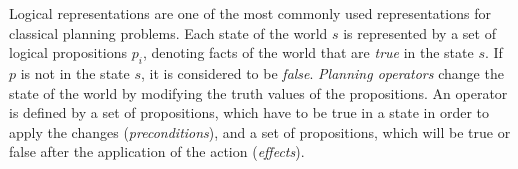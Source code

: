 



\noindent Logical representations are one of the most commonly used representations for classical planning problems. Each state of the world $s$ is represented by a set of logical propositions $p_i$, denoting facts of the world that are \textit{true} in the state $s$. If $p$ is not in the state $s$, it is considered to be \textit{false}.
\textit{Planning operators} change the state of the world by modifying the truth values of the propositions. An operator is defined by a set of propositions, which have to be true in a state in order to apply the changes (\textit{preconditions}), and a set of propositions, which will be true or false after the application of the action (\textit{effects}).

